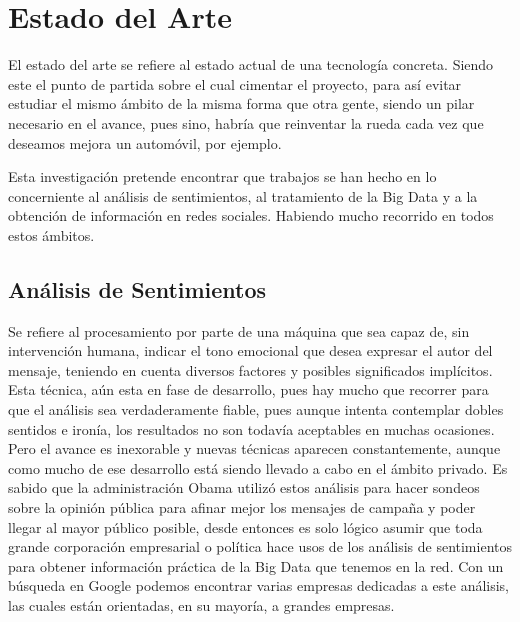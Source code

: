 
\chapter{Estado del Arte }

El estado del arte se refiere al estado actual de una tecnología concreta. Siendo este el punto de partida sobre el cual cimentar el proyecto, para así evitar estudiar el mismo ámbito de la misma forma que otra gente, siendo un pilar necesario en el avance, pues sino, habría que reinventar la rueda cada vez que deseamos mejora un automóvil, por ejemplo. 

Esta investigación pretende encontrar que trabajos se han hecho en lo concerniente al análisis de sentimientos, al tratamiento de la Big Data y a la obtención de información en redes sociales. Habiendo mucho recorrido en todos estos ámbitos. 

\section{Análisis de Sentimientos}

Se refiere al procesamiento por parte de una máquina que sea capaz de, sin intervención humana, indicar el tono emocional que desea expresar el autor del mensaje, teniendo en cuenta diversos factores y posibles significados implícitos. Esta técnica, aún esta en fase de desarrollo, pues hay mucho que recorrer para que el análisis sea verdaderamente fiable, pues aunque intenta contemplar dobles sentidos e ironía, los resultados no son todavía aceptables en muchas ocasiones. Pero el avance es inexorable y nuevas técnicas aparecen constantemente, aunque como mucho de ese desarrollo está siendo llevado a cabo en el ámbito privado. Es sabido que la administración Obama utilizó estos análisis para hacer sondeos sobre la opinión pública para afinar mejor los mensajes de campaña y poder llegar al mayor público posible, desde entonces es solo lógico asumir que toda grande corporación empresarial o política hace usos de los análisis de sentimientos para obtener información práctica de la Big Data que tenemos en la red. Con un búsqueda en Google podemos encontrar varias empresas dedicadas a este análisis, las cuales están orientadas, en su mayoría, a grandes empresas.  

